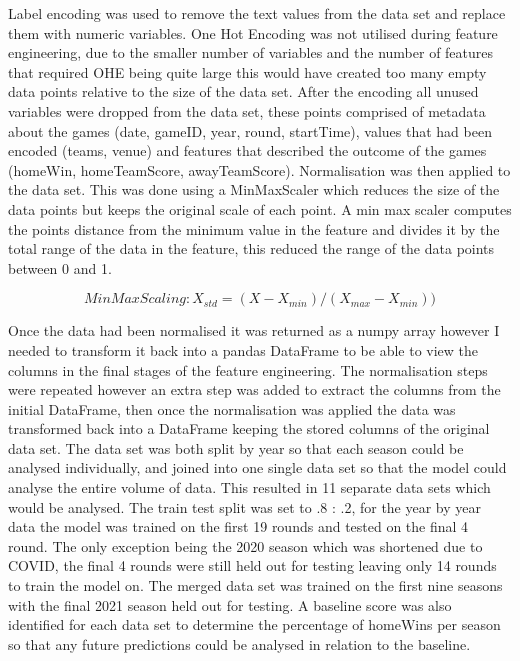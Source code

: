 \documentclass{imc-inf}
\begin{document}
	Label encoding was used to remove the text values from the data set and replace them with numeric variables. One Hot Encoding was not utilised during feature engineering, due to the smaller number of variables and the number of features that required OHE being quite large this would have created too many empty data points relative to the size of the data set. After the encoding all unused variables were dropped from the data set, these points comprised of metadata about the games (date, gameID, year, round, startTime), values that had been encoded (teams, venue) and features that described the outcome of the games (homeWin, homeTeamScore, awayTeamScore). Normalisation was then applied to the data set. This was done using a MinMaxScaler which reduces the size of the data points but keeps the original scale of each point. A min max scaler computes the points distance from the minimum value in the feature and divides it by the total range of the data in the feature, this reduced the range of the data points between 0 and 1.
	
	\begin{equation}
		Min Max Scaling: X_{std} = (X - X_{min}) / (X_{max} - X_{min}))
	\end{equation}
	
	Once the data had been normalised it was returned as a numpy array however I needed to transform it back into a pandas DataFrame to be able to view the columns in the final stages of the feature engineering. The normalisation steps were repeated however an extra step was added to extract the columns from the initial DataFrame, then once the normalisation was applied the data was transformed back into a DataFrame keeping the stored columns of the original data set.
	The data set was both split by year so that each season could be analysed individually, and joined into one single data set so that the model could analyse the entire volume of data. This resulted in 11 separate data sets which would be analysed. The train test split was set to .8 : .2, for the year by year data the model was trained on the first 19 rounds and tested on the final 4 round. The only exception being the 2020 season which was shortened due to COVID, the final 4 rounds were still held out for testing leaving only 14 rounds to train the model on. The merged data set was trained on the first nine seasons with the final 2021 season held out for testing. A baseline score was also identified for each data set to determine the percentage of homeWins per season so that any future predictions could be analysed in relation to the baseline.
	
\end{document}
